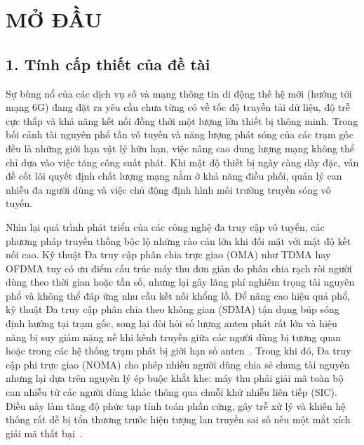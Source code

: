 \chapter*{MỞ ĐẦU}

\section*{1. Tính cấp thiết của đề tài}

Sự bùng nổ của các dịch vụ số và mạng thông tin di động thế hệ mới (hướng tới mạng 6G) đang đặt ra
yêu cầu chưa từng có về tốc độ truyền tải dữ liệu, độ trễ cực thấp và khả năng kết nối đồng thời một
lượng lớn thiết bị thông minh. Trong bối cảnh tài nguyên phổ tần vô tuyến và năng lượng phát sóng của
các trạm gốc đều là những giới hạn vật lý hữu hạn, việc nâng cao dung lượng mạng không thể chỉ dựa vào
việc tăng công suất phát. Khi mật độ thiết bị ngày càng dày đặc, vấn đề cốt lõi quyết định chất lượng
mạng nằm ở khả năng điều phối, quản lý can nhiễu đa người dùng và việc chủ động định hình môi trường
truyền sóng vô tuyến.

Nhìn lại quá trình phát triển của các công nghệ đa truy cập vô tuyến, các phương pháp truyền thống bộc
lộ những rào cản lớn khi đối mặt với mật độ kết nối cao. Kỹ thuật Đa truy cập phân chia trực giao (OMA)
như TDMA hay OFDMA tuy có ưu điểm cấu trúc máy thu đơn giản do phân chia rạch ròi người dùng theo thời
gian hoặc tần số, nhưng lại gây lãng phí nghiêm trọng tài nguyên phổ và không thể đáp ứng nhu cầu kết
nối khổng lồ. Để nâng cao hiệu quả phổ, kỹ thuật Đa truy cập phân chia theo không gian (SDMA) tận dụng
búp sóng định hướng tại trạm gốc, song lại đòi hỏi số lượng anten phát rất lớn và hiệu năng bị suy giảm
nặng nề khi kênh truyền giữa các người dùng bị tương quan hoặc trong các hệ thống trạm phát bị giới hạn
số anten~\cite{Mao2018RSMABridging}. Trong khi đó, Đa truy cập phi trực giao (NOMA) cho phép nhiều người
dùng chia sẻ chung tài nguyên nhưng lại dựa trên nguyên lý ép buộc khắt khe: máy thu phải giải mã toàn
bộ can nhiễu từ các người dùng khác thông qua chuỗi khử nhiễu liên tiếp (SIC). Điều này làm tăng độ phức
tạp tính toán phần cứng, gây trễ xử lý và khiến hệ thống rất dễ bị tổn thương trước hiện tượng lan
truyền sai số nếu một mắt xích giải mã thất bại~\cite{Ding2017NOMASurvey, Islam2017PowerDomainNOMA,
Clerckx2021NOMACritical}.

